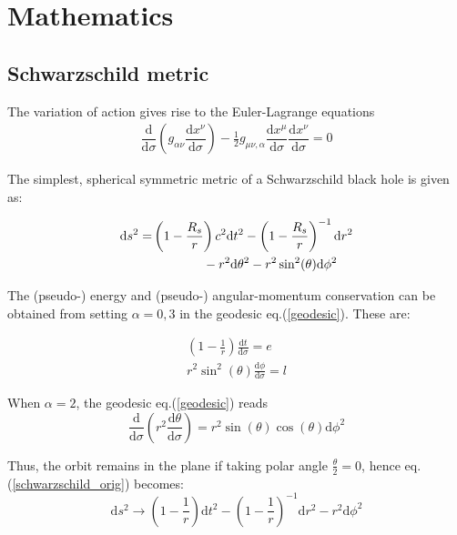 \section{Mathematics}
\label{geometry}

\subsection{Schwarzschild metric}
The variation of action gives rise to the Euler-Lagrange equations
\begin{align}
\dfrac{\mathrm{d}}{\mathrm{d}\sigma} (g_{\alpha\nu}\dfrac{\mathrm{d}x^\nu}{\mathrm{d}\sigma}) - \frac{1}{2}g_{\mu\nu,\alpha} \dfrac{\mathrm{d}x^\mu}{\mathrm{d}\sigma} \dfrac{\mathrm{d}x^\nu}{\mathrm{d}\sigma} = 0
\label{geodesic}
\end{align}

The simplest, spherical symmetric metric of a Schwarzschild black hole is given as:

\begin{align}
\mathrm{d} s ^ 2  = &\left( 1 - \frac{R_s}{r} \right) c ^ 2 \mathrm{d} t ^ 2 - \left( 1 - \frac{R_s}{r} \right) ^ {-1} \mathrm{d} r ^ 2 \notag\\
&\qquad \qquad  - r ^ 2  \mathrm{d}\theta ^ 2 - r^2 \sin^2(\theta) \mathrm{d} \phi ^ 2 
\label{schwarzschild_orig}
\end{align}

The (pseudo-) energy and (pseudo-) angular-momentum conservation can be obtained from setting $\alpha = 0, 3$ in the geodesic eq.(\ref{geodesic}). These are:

\begin{eqnarray}
\left( 1-\frac{1}{r} \right) \frac{\mathrm{d}t}{\mathrm{d}\sigma} = e\\
r^2 \sin^2 (\theta) \frac{\mathrm{d}\phi}{\mathrm{d}\sigma} = l
\end{eqnarray}

When $\alpha=2$, the geodesic eq.(\ref{geodesic}) reads
\begin{equation}
\dfrac{\mathrm{d}}{\mathrm{d}\sigma} ( r^2 \dfrac{\mathrm{d}\theta}{\mathrm{d}\sigma} ) = r^2 \sin(\theta)\cos(\theta) \mathrm{d} \phi ^ 2 
\end{equation}

Thus, the orbit remains in the plane if taking polar angle $\frac{\theta}{2} = 0$, hence eq.(\ref{schwarzschild_orig}) becomes:
\begin{equation}
\mathrm{d} s ^ 2  \longrightarrow \left( 1 - \frac{1}{r} \right) \mathrm{d} t ^ 2 - \left( 1 - \frac{1}{r} \right) ^ {-1} \mathrm{d} r ^ 2 - r ^ 2 \mathrm{d} \phi ^ 2
\end{equation}

